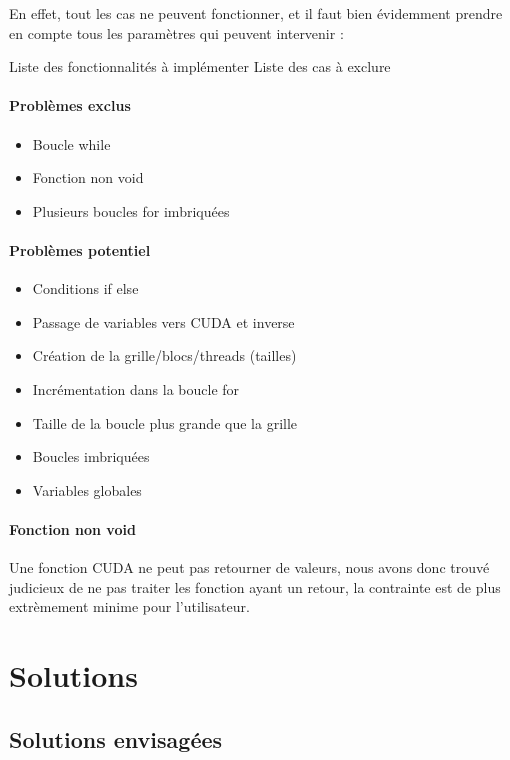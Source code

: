 \documentclass{article}
\begin{document}
	En effet, tout les cas ne peuvent fonctionner, et il faut bien évidemment prendre en compte tous les paramètres qui peuvent intervenir :

	Liste des fonctionnalités à implémenter
	Liste des cas à exclure
	\paragraph{Problèmes exclus}
	\begin{itemize}
  		\item Boucle while
  		\item Fonction non void
  		\item Plusieurs boucles for imbriquées	
	\end{itemize}
	
	\paragraph{Problèmes potentiel}
		\begin{itemize}
  		\item Conditions if else
  		\item Passage de variables vers CUDA et inverse
  		\item Création de la grille/blocs/threads (tailles)
  		\item Incrémentation dans la boucle for
  		\item Taille de la boucle plus grande que la grille
  		\item Boucles imbriquées
  		\item Variables globales
	\end{itemize}
	\paragraph{Fonction non void}
	Une fonction CUDA ne peut pas retourner de valeurs, nous avons donc trouvé judicieux de ne pas traiter les fonction ayant un retour, la contrainte est de plus extrèmement minime pour l'utilisateur.
	
	\newpage	
	
	\section{Solutions}
	

	\subsection{Solutions envisagées}
	
\end{document}
